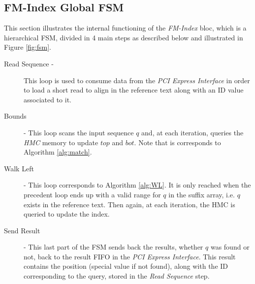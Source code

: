 \subsection{FM-Index Global FSM}

This section illustrates the internal functioning of the \textsl{FM-Index} bloc, which is a hierarchical FSM, divided in 4 main steps as described below and illustrated in Figure \ref{fig:fsm}.
\begin{description}
\item [Read Sequence -] This loop is used to consume data from the \textsl{PCI Express Interface} in order to load a short read to align in the reference text along with an ID value associated to it.
\item [Bounds] - This loop scans the input sequence $q$ and, at each iteration, queries the \textsl{HMC} memory to update $top$ and $bot$. Note that is corresponds to Algorithm \ref{alg:match}.
\item [Walk Left] - This loop corresponds to Algorithm \ref{alg:WL}. It is only reached when the precedent loop ends up with a valid range for $q$ in the suffix array, i.e. $q$ exists in the reference text. Then again, at each iteration, the HMC is queried to update the index.
\item [Send Result] - This last part of the FSM sends back the results, whether $q$ was found or not, back to the result FIFO in the \textsl{PCI Express Interface}. This result contains the position (special value if not found), along with the ID corresponding to the query, stored in the \textsl{Read Sequence} step.
\end{description}
